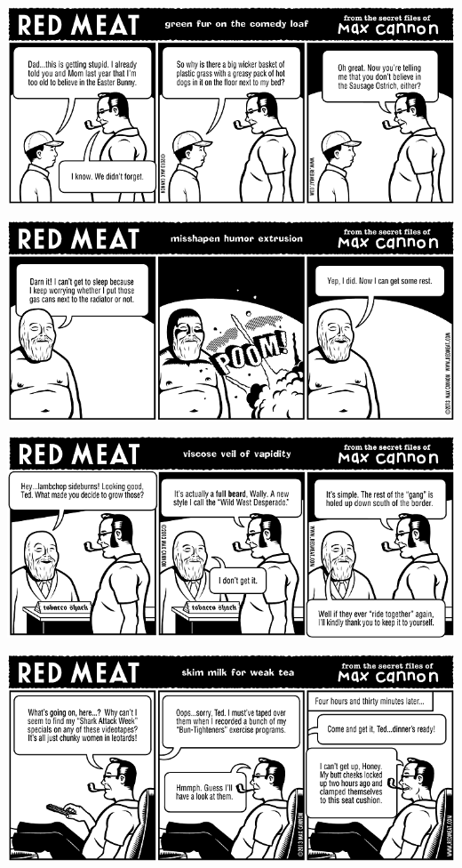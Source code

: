 \documentclass[a4paper,twoside,11pt]{article}
\begin{document}
\includegraphics[width=\textwidth]{redmeat_2013-04-02.png}



\includegraphics[width=\textwidth]{redmeat_2013-04-09.png}



\includegraphics[width=\textwidth]{redmeat_2013-04-16.png}



\includegraphics[width=\textwidth]{redmeat_2013-04-23.png}
\end{document}

